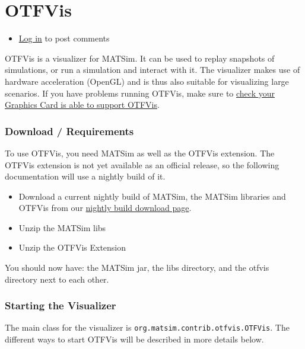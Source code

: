 \documentclass[a4paper,11pt]{report}
\begin{document}

\vfill\eject
\section{OTFVis}
\begin{itemize}
	\item \href{http://www.matsim.org/user/login?destination=comment/reply/693%23comment-form}{Log in} to post comments
\end{itemize}

OTFVis  is a visualizer for MATSim. It can be used to replay snapshots of  simulations, or run a simulation and interact with it. The visualizer  makes use of hardware acceleration (OpenGL) and is thus also suitable  for visualizing large scenarios. If you have problems running OTFVis,  make sure to \href{http://www.matsim.org/docs/extensions/otfvis/opengl}{check your Graphics Card is able to support OTFVis}.

\subsubsection{Download / Requirements}

To use OTFVis, you need MATSim as well as the OTFVis extension. The  OTFVis extension is not yet available as an official release, so the  following documentation will use a nightly build of it.
\begin{itemize}
	\item Download a current nightly build of MATSim, the MATSim libraries and OTFVis from our \href{http://www.matsim.org/files/builds}{nightly build download page}.
	\item Unzip the MATSim libs
	\item Unzip the OTFVis Extension
\end{itemize}

You should now have: the MATSim jar, the libs directory, and the otfvis directory next to each other.

\subsubsection{Starting the Visualizer}

The main class for the visualizer is 
\texttt{org.matsim.contrib.otfvis.OTFVis}. The different ways to start OTFVis will be described in more details below.
\end{document}
